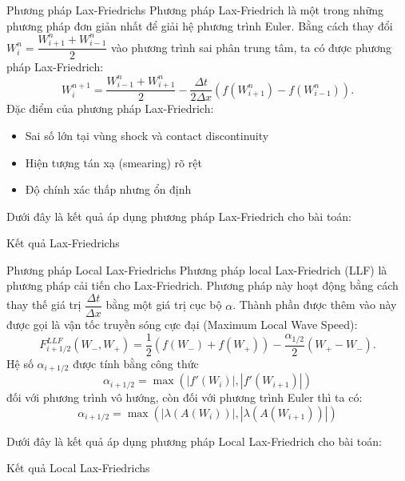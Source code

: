 \documentclass[aspectratio=43,10pt]{beamer}
\begin{document}
\begin{frame}{Phương pháp Lax-Friedrichs}
Phương pháp Lax-Friedrich là một trong những phương pháp đơn giản nhất để giải hệ phương trình Euler. Bằng cách thay đổi $W_i^n = \dfrac{W_{i+1}^n + W_{i-1}^n}{2}$ vào phương trình sai phân trung tâm, ta có được phương pháp Lax-Friedrich:
\[
W_i^{n+1} = \dfrac{W_{i-1}^n + W_{i+1}^n}{2} - \frac{\Delta t}{2\Delta x} \left( f(W_{i+1}^n) - f(W_{i-1}^n) \right).
\]
Đặc điểm của phương pháp Lax-Friedrich:
\begin{itemize}
    \small
    \item Sai số lớn tại vùng shock và contact discontinuity
    \item Hiện tượng tán xạ (smearing) rõ rệt
    \item Độ chính xác thấp nhưng ổn định
\end{itemize}
Dưới đây là kết quả áp dụng phương pháp Lax-Friedrich cho bài toán:
\end{frame}

\begin{frame}{Kết quả Lax-Friedrichs}
\begin{center}
\scalebox{0.6}{}
\end{center}
\vspace{-0.3cm}
\end{frame}

\begin{frame}{Phương pháp Local Lax-Friedrichs}
Phương pháp local Lax-Friedrich (LLF) là phương pháp cải tiến cho Lax-Friedrich. Phương pháp này hoạt động bằng cách thay thế giá trị $\dfrac{\Delta t}{\Delta x}$ bằng một giá trị cục bộ $\alpha$. Thành phần được thêm vào này được gọi là vận tốc truyền sóng cực đại (Maximum Local Wave Speed):
\[
F_{i+1/2}^{LLF}(W_-, W_+) = \frac{1}{2} \left( f(W_-) + f(W_+) \right) - \dfrac{\alpha_{1/2}}{2} \left( W_+ - W_- \right).
\]
Hệ số $\alpha_{i+1/2}$ được tính bằng công thức
\[
\alpha_{i+1/2} = \max \left( |f'(W_i)|, |f'(W_{i+1})| \right)
\]
đối với phương trình vô hướng, còn đối với phương trình Euler thì ta có:
\[
\alpha_{i+1/2} = \max \left( |\lambda(A(W_i))|, |\lambda(A(W_{i+1}))| \right)
\]

Dưới đây là kết quả áp dụng phương pháp Local Lax-Friedrich cho bài toán:
\end{frame}

\begin{frame}{Kết quả Local Lax-Friedrichs}
\begin{center}
\scalebox{0.6}{}
\end{center}
\end{frame}
\end{document}
